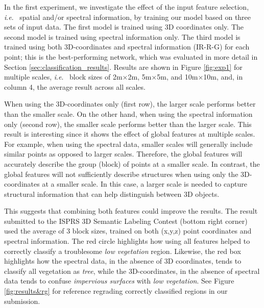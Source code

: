 \documentclass[final,3p,times,twocolumn,authoryear]{elsarticle}
\newcommand{\ie}{\textit{i}.\textit{e}.}
\begin{document}
In the first experiment, we investigate the effect of the input feature selection, \ie~ spatial and/or spectral information, by training our model based on three sets of input data.  
The first model is trained using 3D coordinates only. 
The second model is trained using spectral information only.
The third model is trained using both 3D-coordinates and spectral information (IR-R-G) for each point; this is the best-performing network, which was evaluated in more detail in Section \ref{sec:classification_results}.
Results are shown in Figure \ref{fig:exp1} for multiple scales, \ie~  block sizes of 2m$\times$2m, 5m$\times$5m, and 10m$\times$10m, and,  in column 4, the average result across all scales.

When using the 3D-coordinates only (first row), the larger scale performs better than the smaller scale.
On the other hand, when using the spectral information only (second row), the smaller scale performs better than the larger scale. 
This result is interesting since it shows the effect of global features at multiple scales. 
For example, when using the spectral data, smaller scales will generally include similar points as opposed to larger scales. 
Therefore, the global features will accurately describe the group (block) of points at a smaller scale. 
In contrast, the global features will not sufficiently describe structures when using only the 3D-coordinates at a smaller scale. 
In this case, a larger scale is needed to capture structural information that can help distinguish between 3D objects.

This suggests that combining both features could improve the results. 
The result submitted to the ISPRS 3D Semantic Labeling Contest (bottom right corner) used the average of 3 block sizes, trained on both (x,y,z) point coordinates and spectral information. 
The red circle highlights how using all features helped to correctly classify a troublesome {\it low vegetation} region. 
Likewise, the red box highlights how the spectral data, in the absence of 3D coordinates, tends to classify all vegetation as {\it tree}, while the 3D-coordinates, in the absence of spectral data tends to confuse {\it impervious surfaces} with {\it low vegetation}.
See Figure \ref{fig:results&rg} for reference regrading correctly classified regions in our submission.
\end{document}
